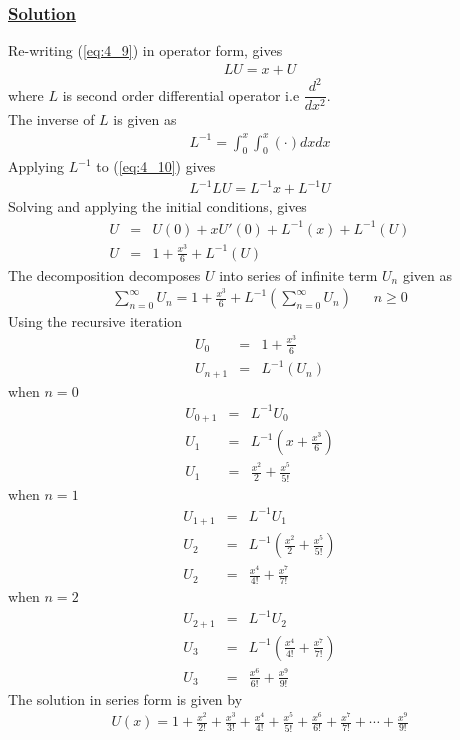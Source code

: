 \documentclass[11pt]{report}
\newcommand{\ubt}[1]{\textbf{\underline{#1}}}
\newcommand{\sps}{\\[0.2cm]}
\newcommand{\refn}[1]{(\ref{#1})}
\newcommand{\refx}[1]{\refn{eq:#1}}
\newcommand{\dsp}{\displaystyle}
\newcommand{\sprime}{'}
\newcommand{\solution}{\subsubsection{\ubt{Solution}}}
\begin{document}
	\solution
	Re-writing \refx{4_9} in operator form, gives
	\begin{eqnarray}
		LU = x+U\label{eq:4_10}
	\end{eqnarray}
	where $L$ is second order differential operator i.e $\dsp\dfrac{d^2}{dx^2}$. \\
	The inverse of $L$ is given as
	\begin{eqnarray}
		L^{-1} = \int_0^x\int_0^x(\cdot)dxdx
	\end{eqnarray}
	Applying $L^{-1}$ to \refx{4_10} gives
	\begin{eqnarray}
		L^{-1}LU = L^{-1}x + L^{-1}U
	\end{eqnarray}
	Solving and applying the initial conditions, gives
	\begin{eqnarray}
		U &=&U(0) + xU\sprime(0) + L^{-1}(x) + L^{-1}(U)\sps
		U &=& 1 + \frac{x^3}{6} + L^{-1}(U)\label{eq:4_14}
	\end{eqnarray}
	The decomposition decomposes $U$ into series of infinite term $U_n$ given as
	\begin{eqnarray}
		\sum_{n=0}^{\infty}U_n = 1 + \frac{x^3}{6}+ L^{-1}\left(\sum_{n=0}^\infty U_n\right)~~~~~~~ n \geq 0
	\end{eqnarray}
	Using the recursive iteration
	\begin{eqnarray*}
		U_0 &=& 1 + \frac{x^3}{6}\sps
		U_{n+1} &=& L^{-1}(U_n)
	\end{eqnarray*}
	when $n=0$
	\begin{eqnarray*}
		U_{0+1} & =& L^{-1} U_0\sps
		U_1 &=& L^{-1}\left(x + \frac{x^3}{6}\right)\sps
		U_1 &=& \frac{x^2}{2} + \frac{x^5}{5!}
	\end{eqnarray*}
	when $n=1$
	\begin{eqnarray*}
		U_{1+1} & =& L^{-1}U_1\sps
		U_2 &=& L^{-1}\left(\frac{x^2}{2}+\frac{x^5}{5!}\right)\sps
		U_2 &=& \frac{x^4}{4!} + \frac{x^7}{7!}
	\end{eqnarray*}
	when $n=2$
	\begin{eqnarray*}
		U_{2+1} &=& L^{-1}U_2\sps
		U_3 &=& L^{-1}\left(\frac{x^4}{4!}+ \frac{x^7}{7!}\right)\sps
		U_3 &=& \frac{x^6}{6!} + \frac{x^9}{9!}
	\end{eqnarray*}
	The solution in series form is given by 
	\begin{eqnarray*}
		U(x) = 1 + \frac{x^2}{2!} + \frac{x^3}{3!} + \frac{x^4}{4!} + \frac{x^5}{5!} + \frac{x^6}{6!} + \frac{x^7}{7!} + \cdots + \frac{x^9}{9!}
	\end{eqnarray*}
	
\end{document}
